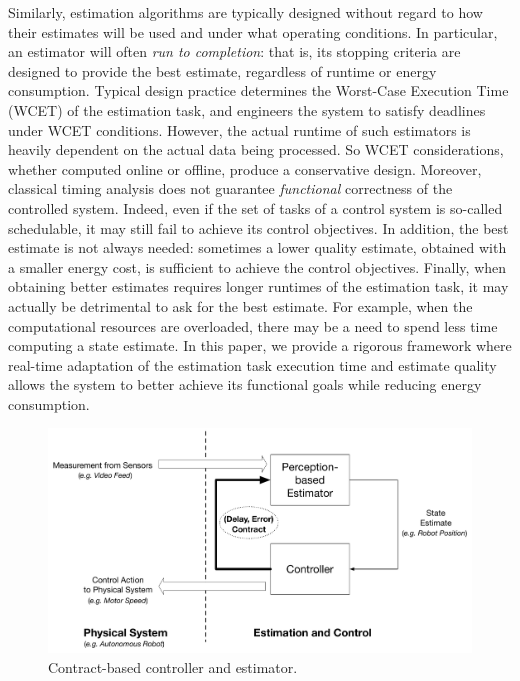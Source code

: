 Similarly, estimation algorithms are typically designed without regard to how their estimates will be used and under what operating conditions.
In particular, an estimator will often \emph{run to completion}: that is, its stopping criteria are designed to provide the best estimate, regardless of runtime or energy consumption.
Typical design practice determines the Worst-Case Execution Time (WCET) of the estimation task, and engineers the system to satisfy deadlines under WCET conditions.
However, the actual runtime of such estimators is heavily dependent on the actual data being processed. 
So WCET considerations, whether computed online or offline, produce a conservative design.
Moreover, classical timing analysis does not guarantee \emph{functional} correctness of the controlled system.
Indeed, even if the set of tasks of a control system is so-called schedulable, it may still fail to achieve its control objectives.
In addition, the best estimate is not always needed:
sometimes a lower quality estimate, obtained with a smaller energy cost, is sufficient to achieve the control objectives.
Finally, when obtaining better estimates requires longer runtimes of the estimation task, it may actually be detrimental to ask for the best estimate.
For example, when the computational resources are overloaded, there may be a need to spend less time computing a state estimate. 
In this paper, we provide a rigorous framework where real-time adaptation of the estimation task execution time and estimate quality allows the system to better achieve its functional goals while reducing energy consumption.
\begin{figure}[t]
	\centering
	\includegraphics[scale=0.3]{figures/omnigraffle_figures/high_level_figure.pdf}
	\caption{Contract-based controller and estimator.}
	\label{fig:codesignedCE}
\end{figure}

